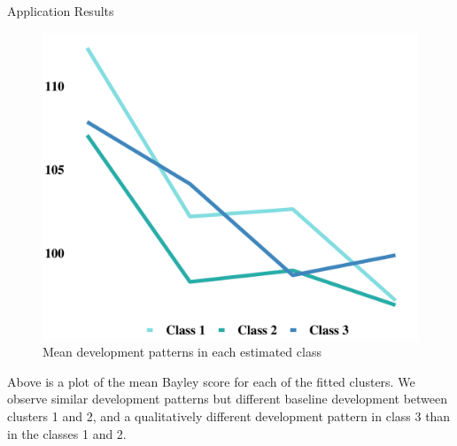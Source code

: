 \documentclass[final]{beamer}
\newlength{\onecolwid}
\begin{document}
\begin{frame}[t]
\begin{columns}[t]
\begin{column}{\onecolwid}
\begin{block}{Application Results}
\begin{figure}
\includegraphics[height=0.8\linewidth,width=1\linewidth]{clust_trends.pdf}
\caption{Mean development patterns in each estimated class}
\end{figure}

Above is a plot of the mean Bayley score for each of the fitted clusters. We observe similar development patterns but different baseline development between clusters 1 and 2, and a qualitatively different development pattern in class 3 than in the classes 1 and 2. 


\end{block}













\end{column}
\end{columns}
\end{frame}
\end{document}
